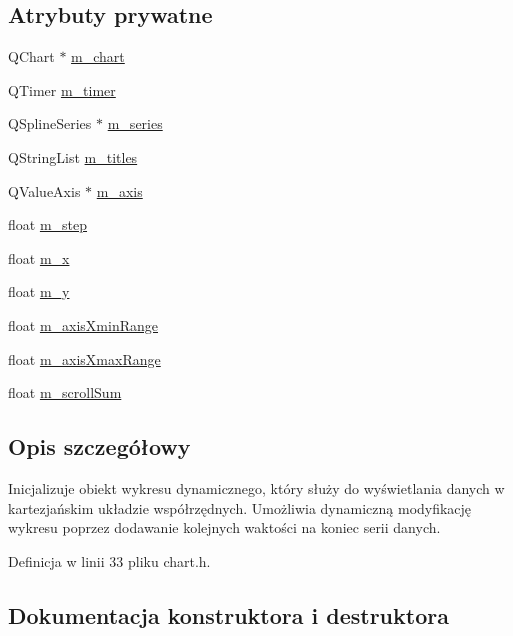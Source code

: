 \subsection*{Atrybuty prywatne}
\begin{DoxyCompactItemize}
\item 
Q\+Chart $\ast$ \hyperlink{class_chart_a69884a7924456327e2ab0148a133339e}{m\+\_\+chart}
\item 
Q\+Timer \hyperlink{class_chart_a0537ed43bfbba8ae3c90bd2fd01924e9}{m\+\_\+timer}
\item 
Q\+Spline\+Series $\ast$ \hyperlink{class_chart_a6dcaf24ec43e6521ba3046a98545b9a6}{m\+\_\+series}
\item 
Q\+String\+List \hyperlink{class_chart_a55c846b0e4068481081d061559efd155}{m\+\_\+titles}
\item 
Q\+Value\+Axis $\ast$ \hyperlink{class_chart_aca1b02de1a6e6f3e68bbd1a9393a30de}{m\+\_\+axis}
\item 
float \hyperlink{class_chart_a1a75b604ca836461e0693e344419442b}{m\+\_\+step}
\item 
float \hyperlink{class_chart_ac5211a2a9116f2853ae511417b9bca9e}{m\+\_\+x}
\item 
float \hyperlink{class_chart_a1f3e3584c5d5d90d8ebaf1b6b98d3df5}{m\+\_\+y}
\item 
float \hyperlink{class_chart_a7d700eba4e63460db9f01eb605ff87ca}{m\+\_\+axis\+Xmin\+Range}
\item 
float \hyperlink{class_chart_a2b91048e821ac0bcc9097884d6fe3c1d}{m\+\_\+axis\+Xmax\+Range}
\item 
float \hyperlink{class_chart_a0c95ab267312d1761d18fbe110d52697}{m\+\_\+scroll\+Sum}
\end{DoxyCompactItemize}


\subsection{Opis szczegółowy}
Inicjalizuje obiekt wykresu dynamicznego, który służy do wyświetlania danych w kartezjańskim układzie współrzędnych. Umożliwia dynamiczną modyfikację wykresu poprzez dodawanie kolejnych waktości na koniec serii danych. 

Definicja w linii 33 pliku chart.\+h.



\subsection{Dokumentacja konstruktora i destruktora}
\mbox{\label{class_chart_a2048aeb5666281b3e8feb4bef3ce9c11}} 
